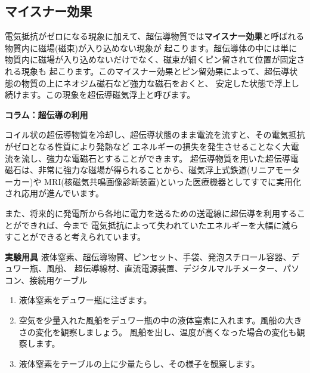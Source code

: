 \subsection{マイスナー効果}

電気抵抗がゼロになる現象に加えて、超伝導物質では{\bf  マイスナー効果}と呼ばれる物質内に磁場(磁束)が入り込めない現象が
起こります。超伝導体の中には単に物質内に磁場が入り込めないだけでなく、磁束が細くピン留されて位置が固定される現象も
起こります。このマイスナー効果とピン留効果によって、超伝導状態の物質の上にネオジム磁石など強力な磁石をおくと、
安定した状態で浮上し続けます。この現象を超伝導磁気浮上と呼びます。


\bigskip

\begin{itembox}[l]{\bf コラム：超伝導の利用}

コイル状の超伝導物質を冷却し、超伝導状態のまま電流を流すと、その電気抵抗がゼロとなる性質により発熱など
エネルギーの損失を発生させることなく大電流を流し、強力な電磁石とすることができます。
超伝導物質を用いた超伝導電磁石は、非常に強力な磁場が得られることから、磁気浮上式鉄道(リニアモーターカー)や
MRI(核磁気共鳴画像診断装置)といった医療機器としてすでに実用化され応用が進んでいます。

また、将来的に発電所から各地に電力を送るための送電線に超伝導を利用することができれば、今まで
電気抵抗によって失われていたエネルギーを大幅に減らすことができると考えられています。


\end{itembox}

\newpage

\jikken

\begin{itemsquarebox}[c]{\bf 実験用具}
液体窒素、超伝導物質、ピンセット、手袋、発泡スチロール容器、デュワー瓶、風船、
超伝導線材、直流電源装置、デジタルマルチメーター、パソコン、接続用ケーブル
\end{itemsquarebox}

\bigskip



\begin{enumerate}

\item 液体窒素をデュワー瓶に注ぎます。
\item 空気を少量入れた風船をデュワー瓶の中の液体窒素に入れます。風船の大きさの変化を観察しましょう。
風船を出し、温度が高くなった場合の変化も観察します。
\item 液体窒素をテーブルの上に少量たらし、その様子を観察します。

\end{enumerate}

